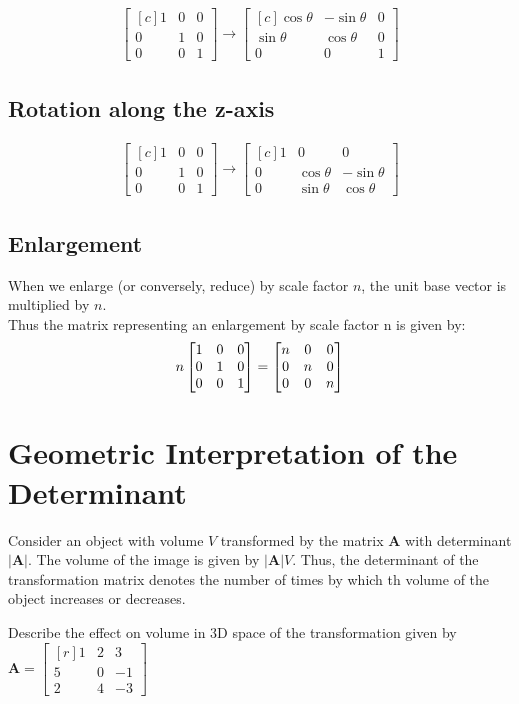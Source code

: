 \begin{align*}
\begin{bmatrix*}[c]1&0&0\\0&1&0\\0&0&1\end{bmatrix*} \rightarrow \begin{bmatrix*}[c]\cos\theta&-\sin\theta&0\\\sin\theta&\cos\theta&0\\0&0&1\end{bmatrix*}
\end{align*}
\subsection{Rotation along the z-axis}

\begin{align*}
\begin{bmatrix*}[c]1&0&0\\0&1&0\\0&0&1\end{bmatrix*} \rightarrow \begin{bmatrix*}[c]1&0&0\\0&\cos\theta&-\sin\theta\\0&\sin\theta&\cos\theta\end{bmatrix*}
\end{align*}
\subsection{Enlargement}
When we enlarge (or conversely, reduce) by scale factor $n$, the unit base vector is multiplied by $n$.\\
Thus the matrix representing an enlargement by scale factor n is given by:
\begin{align*}
n\identitymatrix = \begin{bmatrix*}[c]n&0&0\\0&n&0\\0&0&n\end{bmatrix*}
\end{align*}
\section{Geometric Interpretation of the Determinant}
Consider an object with volume $V$ transformed by the matrix $\mathbf A$ with determinant $|\mathbf A|$. 
The volume of the image is given by $|\mathbf A|V$. Thus, the determinant of the transformation matrix denotes the number of times by which th volume of the object increases or decreases.
\begin{example}
	Describe the effect on volume in $3$D space of the transformation given by $\mathbf{A} = \begin{bmatrix*}[r]1&2&3\\5&0&-1\\2&4&-3\end{bmatrix*}$
\end{example}

